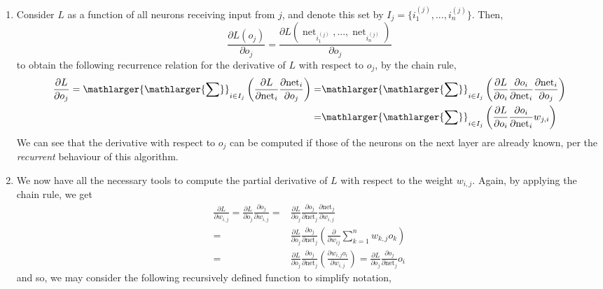 \documentclass{article}
\DeclareMathOperator{\net}{net}
\begin{document}
\begin{enumerate}
    \item Consider $L$ as a function of all neurons receiving input from $j$, and denote this set by $I_j =\{ i_1^{(j)}, ..., i_n^{(j)}\}$. Then, 
    $$\frac{\partial {L(o_j)}}{\partial {o_j}} = \frac{\partial {L(\net_{i_1^{(j)}}, ..., \net_{i_n^{(j)}})}}{\partial {o_j}} {} $$
    to obtain the following recurrence relation for the derivative of $L$ with respect to $o_j$, by the chain rule, 
    \begin{equation}\label{deriv_o_j}
      \begin{split}
        \frac{\partial {L}}{\partial {o_j}} = \mathlarger{\mathlarger{\sum}}^{}_{i \in I_j} \left( \frac{\partial {L}}{\partial {\net_i}} \frac{\partial {\net_i}}{\partial {o_j}}  \right)  =&  \mathlarger{\mathlarger{\sum}}^{}_{i \in I_j} \left( \frac{\partial {L}}{\partial {o_i}} \frac{\partial {o_i}}{\partial {\net_i}} \frac{\partial {\net_i }}{\partial {o_j}} \right) \\ =&\mathlarger{\mathlarger{\sum}}^{}_{i \in I_j} \left( \frac{\partial {L}}{\partial {o_i}} \frac{\partial {o_i}}{\partial {\net_i}} w_{j,i}\right) 
      \end{split}
    \end{equation}
    We can see that the derivative with respect to $o_j$ can be computed if those of the neurons on the next layer are already known, per the \textit{recurrent} behaviour of this algorithm. 
    \item We now have all the necessary tools to compute the partial derivative of $L$ with respect to the weight $w_{i,j}$. Again, by applying the chain rule, we get
    \begin{equation}\label{deriv_w}
  \begin{split}
    {\frac {\partial L}{\partial w_{i,j}}}={\frac {\partial L}{\partial o_{j}}}{\frac {\partial o_{j}}{\partial w_{i,j}}}=&{\frac {\partial L}{\partial o_{j}}}{\frac {\partial o_{j}}{\partial {\text{net}}_{j}}}{\frac {\partial {\text{net}}_{j}}{\partial w_{i,j}}}\\ 
    =& {\frac {\partial L}{\partial o_{j}}}{\frac {\partial o_{j}}{\partial {\text{net}}_{j}}} \left(\frac{\partial {}}{\partial {w_{ij}}} {\sum^{n}_{k=1} w_{k,j}o_k}\right) \\ 
    =&{\frac {\partial L}{\partial o_{j}}}{\frac {\partial o_{j}}{\partial {\text{net}}_{j}}} \left(\frac{\partial {w_{i,j} o_i}}{\partial {w_{i,j}}} \right)={\frac {\partial L}{\partial o_{j}}}{\frac {\partial o_{j}}{\partial {\text{net}}_{j}}} o_i
  \end{split}
\end{equation}
   and so, we may consider the following recursively defined function to simplify notation,


\end{enumerate}
\end{document}
